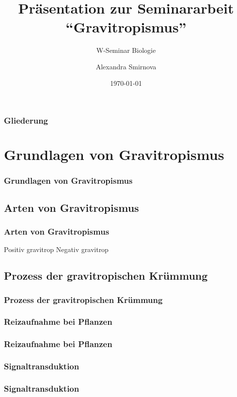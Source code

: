 \documentclass[11pt, aspectratio=169]{beamer}
\author{Alexandra Smirnova}
\title{Präsentation zur Seminararbeit \hyphenquote{ngerman}{Gravitropismus}}
\subtitle{W-Seminar Biologie}
\date{\today}
\begin{document}
	\maketitle
	
	\begin{frame}
		\frametitle{Gliederung}
		\tableofcontents
	\end{frame}
	
	\section{Grundlagen von Gravitropismus}

	
	\begin{frame}
		\frametitle{Grundlagen von Gravitropismus}
	\end{frame}
	
	\subsection{Arten von Gravitropismus}
	
	\begin{frame}
		\frametitle{Arten von Gravitropismus}
		Positiv gravitrop
		Negativ gravitrop
		
	\end{frame}
	
	\subsection{Prozess der gravitropischen Krümmung}
	
	\begin{frame}
		\frametitle{Prozess der gravitropischen Krümmung}
	\end{frame}
		
	\subsubsection{Reizaufnahme bei Pflanzen}
		
	\begin{frame}
		\frametitle{Reizaufnahme bei Pflanzen}
	\end{frame}
			
	\subsubsection{Signaltransduktion}
		
	\begin{frame}
		\frametitle{Signaltransduktion}
	\end{frame}
			
\end{document}
